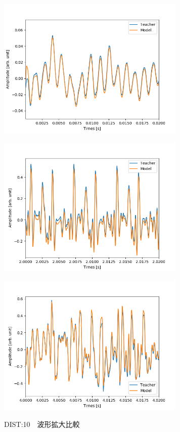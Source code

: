 \documentclass{jreport}		%
\begin{document}
\begin{figure}[htbp]
\begin{minipage}{0.5\hsize}
\begin{center}
 \end{center}
 \label{fig:one}
 \end{minipage}
 \begin{minipage}{0.5\hsize}
 \begin{center}
  \includegraphics[width=90mm]{gain10_output_hikaku4.png}
 \end{center}
 \label{fig:two}
 \end{minipage}
 \begin{minipage}{0.5\hsize}
 \begin{center}
  \includegraphics[width=90mm]{gain10_output_hikaku5.png}
 \end{center}
 \label{fig:one}
 \end{minipage}
 \begin{minipage}{0.5\hsize}
 \begin{center}
  \includegraphics[width=90mm]{gain10_output_hikaku6.png}
 \end{center}
 \label{fig:two}
 \end{minipage}
 \caption{DIST:10　波形拡大比較}
\end{figure}
\end{document}
